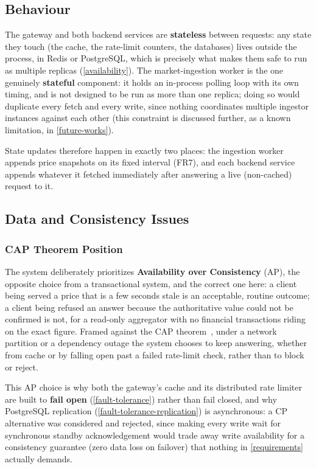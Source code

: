 \documentclass{scrartcl}
\begin{document}
\subsection{Behaviour}\label{behaviour}

The gateway and both backend services are \textbf{stateless} between requests: any state they
touch (the cache, the rate-limit counters, the databases) lives outside the process, in Redis or
PostgreSQL, which is precisely what makes them safe to run as multiple replicas
(\cref{availability}). The market-ingestion worker is the one genuinely \textbf{stateful}
component: it holds an in-process polling loop with its own timing, and is not designed to be run
as more than one replica; doing so would duplicate every fetch and every write, since nothing
coordinates multiple ingestor instances against each other (this constraint is discussed further,
as a known limitation, in \cref{future-works}).

State updates therefore happen in exactly two places: the ingestion worker appends price
snapshots on its fixed interval (FR7), and each backend service appends whatever it fetched
immediately after answering a live (non-cached) request to it.

\subsection{Data and Consistency Issues}\label{data-and-consistency-issues}

\subsubsection{CAP Theorem Position}\label{cap-theorem-position}

The system deliberately prioritizes \textbf{Availability over Consistency} (AP), the opposite
choice from a transactional system, and the correct one here: a client being served a price that
is a few seconds stale is an acceptable, routine outcome; a client being refused an answer
because the authoritative value could not be confirmed is not, for a read-only aggregator with no
financial transactions riding on the exact figure. Framed against the CAP
theorem~\citep{brewer2000towards,gilbert2002brewer}, under a network partition or a dependency
outage the system chooses to keep answering, whether from cache or by falling open past a failed
rate-limit check, rather than to block or reject.

This AP choice is why both the gateway's cache and its distributed rate limiter are built to
\textbf{fail open} (\cref{fault-tolerance}) rather than fail closed, and why PostgreSQL
replication (\cref{fault-tolerance-replication}) is asynchronous: a CP alternative was considered
and rejected, since making every write wait for synchronous standby acknowledgement would trade
away write availability for a consistency guarantee (zero data loss on failover) that nothing in
\cref{requirements} actually demands.
\end{document}

